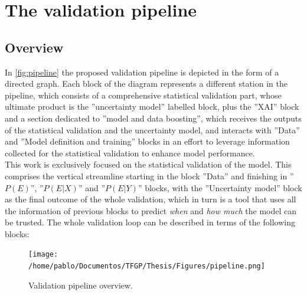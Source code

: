 \chapter{The validation pipeline}\label{chap:3}
%
\label{chap:Chap_1}

\section{Overview}
\indent In \autoref{fig:pipeline} the proposed validation pipeline is depicted in the form of a directed graph. Each block of the diagram represents a different station in the pipeline, which consists of a comprehensive statistical validation part, whose ultimate product is the ''uncertainty model'' labelled block, plus the ''XAI'' block and a section dedicated to ''model and data boosting'', which receives the outputs of the statistical validation and the uncertainty model, and interacts with ''Data'' and ''Model definition and training'' blocks in an effort to leverage information collected for the statistical validation to enhance model performance.\\
%
\indent This work is exclusively focused on the statistical validation of the model. This comprises the vertical streamline starting in the block ''Data'' and finishing in ''$P(E)$'', ''$P(E|X)$'' and ''$P(E|Y)$'' blocks, with the ''Uncertainty model'' block as the final outcome of the whole validation, which in turn is a tool that uses all the information of previous blocks to predict \textit{when} and \textit{how much} the model can be trusted. The whole validation loop can be described in terms of the following blocks:

\begin{figure}[!htb]
	\centering
	\texttt{[image: /home/pablo/Documentos/TFGP/Thesis/Figures/pipeline.png]}
	\caption{Validation pipeline overview.}
	\label{fig:pipeline}
\end{figure}

